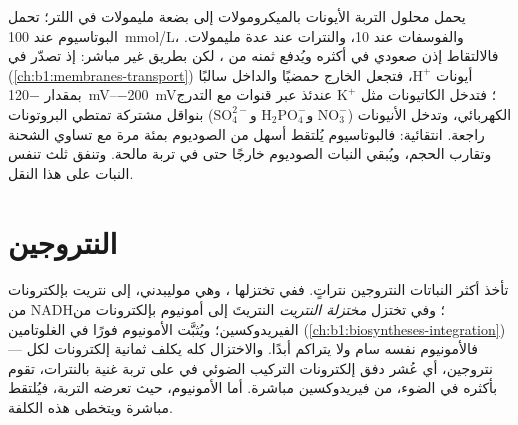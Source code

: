 \begin{proposition}\label{prop:b1:plant-water-minerals:uptake}
يحمل محلول التربة الأيونات بالميكرومولات إلى بضعة مليمولات في
اللتر؛   تحمل البوتاسيوم عند \qty{100}{mmol/L}،
والفوسفات عند \qty{10}{}، والنترات عند عدة مليمولات. فالالتقاط إذن
صعودي في أكثره ويُدفع ثمنه من ، لكن بطريق غير مباشر: إذ تصدّر
\emph{} في 
(\cref{ch:b1:membranes-transport}) أيونات $\mathrm{H^+}$، فتجعل
الخارج حمضيًا والداخل سالبًا بمقدار
\qtyrange{-120}{-200}{mV}؛ فتدخل الكاتيونات مثل $\mathrm{K^+}$
عندئذ عبر قنوات مع التدرج الكهربائي، وتدخل الأنيونات
($\mathrm{NO_3^-}$ و$\mathrm{H_2PO_4^-}$ و$\mathrm{SO_4^{2-}}$)
بنواقل مشتركة تمتطي البروتونات راجعة.  انتقائية: فالبوتاسيوم
يُلتقط أسهل من الصوديوم بمئة مرة مع تساوي الشحنة وتقارب الحجم،
ويُبقي النبات الصوديوم خارجًا حتى في تربة مالحة. وتنفق  ثلث
تنفس النبات على هذا النقل.
\end{proposition}

\section{النتروجين}

\begin{proposition}\label{prop:b1:plant-water-minerals:nitrate}
تأخذ أكثر النباتات النتروجين نتراتٍ. ففي  تختزلها
\emph{}، وهي  موليبدني، إلى نتريت بإلكترونات من
NADH؛ وفي  تختزل \emph{مختزلة النتريت} النتريتَ إلى
أمونيوم بإلكترونات من الفيريدوكسين؛ ويُثبَّت الأمونيوم فورًا في
الغلوتامين  (\cref{ch:b1:biosyntheses-integration})
--- فالأمونيوم نفسه سام ولا يتراكم أبدًا. والاختزال كله يكلف ثمانية
إلكترونات لكل نتروجين، أي عُشر دفق إلكترونات التركيب الضوئي في
 على تربة غنية بالنترات،  تقوم بأكثره في الضوء، من
فيريدوكسين  مباشرة. أما الأمونيوم، حيث تعرضه
التربة، فيُلتقط مباشرة ويتخطى هذه الكلفة.
\end{proposition}

